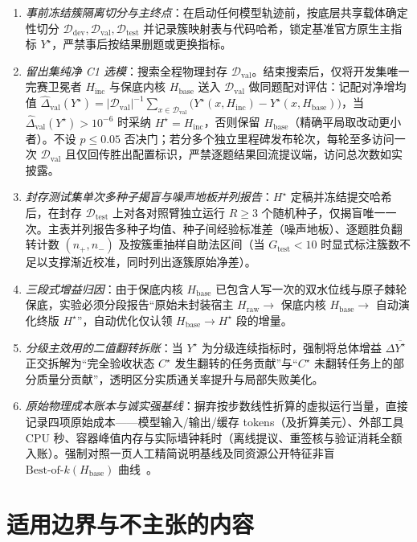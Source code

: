 \documentclass[UTF8,a4paper,10.5pt]{ctexart}
\newcommand{\Ddev}{\mathcal{D}_{\mathrm{dev}}}
\newcommand{\Dval}{\mathcal{D}_{\mathrm{val}}}
\newcommand{\Dtest}{\mathcal{D}_{\mathrm{test}}}
\begin{document}
\begin{enumerate}
  \item \emph{事前冻结簇隔离切分与主终点}：在启动任何模型轨迹前，按底层共享载体确定性切分 $\Ddev,\Dval,\Dtest$ 并记录簇映射表与代码哈希，锁定基准官方原生主指标 $Y^\star$，严禁事后按结果删题或更换指标。
  \item \emph{留出集纯净 C1 选模}：搜索全程物理封存 $\Dval$。结束搜索后，仅将开发集唯一完赛卫冕者 $H_{\mathrm{inc}}$ 与保底内核 $H_{\mathrm{base}}$ 送入 $\Dval$ 做同题配对评估：记配对净增均值 $\hat{\Delta}_{\mathrm{val}}(Y^\star) = |\Dval|^{-1}\sum_{x\in\Dval}\bigl(Y^\star(x,H_{\mathrm{inc}})-Y^\star(x,H_{\mathrm{base}})\bigr)$，当 $\hat{\Delta}_{\mathrm{val}}(Y^\star)>10^{-6}$ 时采纳 $H^\star=H_{\mathrm{inc}}$，否则保留 $H_{\mathrm{base}}$（精确平局取改动更小者）。不设 $p\le 0.05$ 否决门；若分多个独立里程碑发布轮次，每轮至多访问一次 $\Dval$ 且仅回传胜出配置标识，严禁逐题结果回流提议端，访问总次数如实披露。
  \item \emph{封存测试集单次多种子揭盲与噪声地板并列报告}：$H^\star$ 定稿并冻结提交哈希后，在封存 $\Dtest$ 上对各对照臂独立运行 $R\ge 3$ 个随机种子，仅揭盲唯一一次。主表并列报告多种子均值、种子间经验标准差（噪声地板）、逐题胜负翻转计数 $(n_+,n_-)$ 及按簇重抽样自助法区间（当 $G_{\mathrm{test}}<10$ 时显式标注簇数不足以支撑渐近校准，同时列出逐簇原始净差）。
  \item \emph{三段式增益归因}：由于保底内核 $H_{\mathrm{base}}$ 已包含人写一次的双水位线与原子棘轮保底，实验必须分段报告“原始未封装宿主 $H_{\mathrm{raw}} \to$ 保底内核 $H_{\mathrm{base}} \to$ 自动演化终版 $H^\star$”，自动优化仅认领 $H_{\mathrm{base}}\to H^\star$ 段的增量。
  \item \emph{分级主效用的二值翻转拆账}：当 $Y^\star$ 为分级连续指标时，强制将总体增益 $\Delta\overline{Y^\star}$ 正交拆解为“完全验收状态 $C^\star$ 发生翻转的任务贡献”与“$C^\star$ 未翻转任务上的部分质量分贡献”，透明区分实质通关率提升与局部失败美化。
  \item \emph{原始物理成本账本与诚实强基线}：摒弃按步数线性折算的虚拟运行当量，直接记录四项原始成本——模型输入/输出/缓存 tokens（及折算美元）、外部工具 CPU 秒、容器峰值内存与实际墙钟耗时（离线提议、重签核与验证消耗全额入账）。强制对照一页人工精简说明基线及同资源公开特征非盲 $\text{Best-of-}k(H_{\mathrm{base}})$ 曲线~\cite{rethinking}。
\end{enumerate}

\section{适用边界与不主张的内容}
\label{sec:limits}
\end{document}
